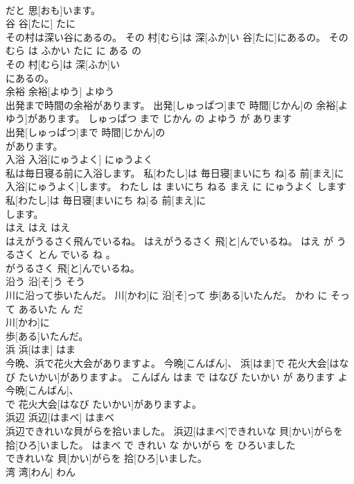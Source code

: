 \documentclass[8pt]{extreport}
\begin{document}
\begin{CJK}{UTF8}{min}
\\	だと 思[おも]います。			
\\	谷	谷[たに]	たに	
\\	その村は深い谷にあるの。	その 村[むら]は 深[ふか]い 谷[たに]にあるの。	その むら は ふかい たに に ある の	
\\	その 村[むら]は 深[ふか]い
\\	にあるの。			
\\	余裕	余裕[よゆう]	よゆう	
\\	出発まで時間の余裕があります。	出発[しゅっぱつ]まで 時間[じかん]の 余裕[よゆう]があります。	しゅっぱつ まで じかん の よゆう が あります	
\\	出発[しゅっぱつ]まで 時間[じかん]の
\\	があります。			
\\	入浴	入浴[にゅうよく]	にゅうよく	
\\	私は毎日寝る前に入浴します。	私[わたし]は 毎日寝[まいにち ね]る 前[まえ]に 入浴[にゅうよく]します。	わたし は まいにち ねる まえ に にゅうよく します	
\\	私[わたし]は 毎日寝[まいにち ね]る 前[まえ]に
\\	します。			
\\	はえ	はえ	はえ	
\\	はえがうるさく飛んでいるね。	はえがうるさく 飛[と]んでいるね。	はえ が うるさく とん でいる ね 。	
\\	がうるさく 飛[と]んでいるね。			
\\	沿う	沿[そ]う	そう	
\\	川に沿って歩いたんだ。	川[かわ]に 沿[そ]って 歩[ある]いたんだ。	かわ に そって あるいた ん だ	
\\	川[かわ]に
\\	歩[ある]いたんだ。			
\\	浜	浜[はま]	はま	
\\	今晩、浜で花火大会がありますよ。	今晩[こんばん]、 浜[はま]で 花火大会[はなび たいかい]がありますよ。	こんばん はま で はなび たいかい が あります よ	
\\	今晩[こんばん]、
\\	で 花火大会[はなび たいかい]がありますよ。			
\\	浜辺	浜辺[はまべ]	はまべ	
\\	浜辺できれいな貝がらを拾いました。	浜辺[はまべ]できれいな 貝[かい]がらを 拾[ひろ]いました。	はまべ で きれい な かいがら を ひろいました	
\\	できれいな 貝[かい]がらを 拾[ひろ]いました。			
\\	湾	湾[わん]	わん	

\end{CJK}
\end{document}
